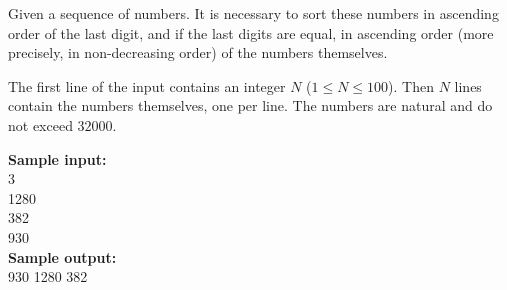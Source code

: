 \documentclass[a4paper]{article}
\begin{document}
Given a sequence of numbers. It is necessary to sort these numbers in ascending order of the last digit, and if the last digits are equal, in ascending order (more precisely, in non-decreasing order) of the numbers themselves.

The first line of the input contains an integer $N$ ($1 \le N \le 100$). Then $N$ lines contain the numbers themselves, one per line. The numbers are natural and do not exceed $32000$.

\LINE

\noindent \textbf{Sample input:}\\
3\\
1280\\
382\\
930\\


\noindent \textbf{Sample output:}\\
930 1280 382
\end{document}

